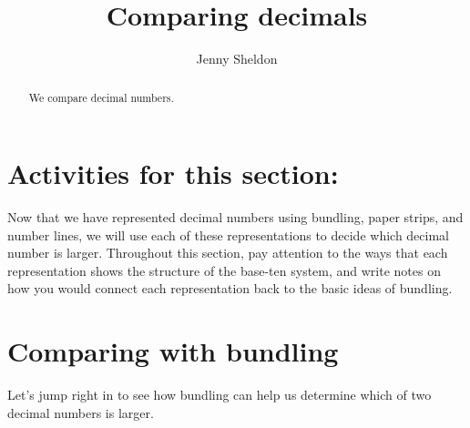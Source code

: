 \documentclass{ximera}
\title{Comparing decimals}
\author{Jenny Sheldon}
\begin{document}
\begin{abstract}
We compare decimal numbers.
\end{abstract}
\maketitle

\section{Activities for this section:} 

\vskip 0.2in

Now that we have represented decimal numbers using bundling, paper strips, and number lines, we will use each of these representations to decide which decimal number is larger. Throughout this section, pay attention to the ways that each representation shows the structure of the base-ten system, and write notes on how you would connect each representation back to the basic ideas of bundling.


\section{Comparing with bundling}


Let's jump right in to see how bundling can help us determine which of two decimal numbers is larger.
\end{document}
